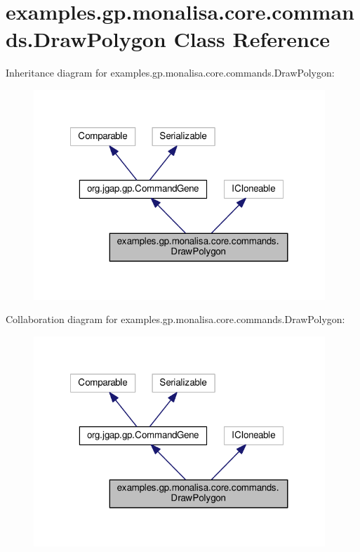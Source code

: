 \hypertarget{classexamples_1_1gp_1_1monalisa_1_1core_1_1commands_1_1_draw_polygon}{\section{examples.\-gp.\-monalisa.\-core.\-commands.\-Draw\-Polygon Class Reference}
\label{classexamples_1_1gp_1_1monalisa_1_1core_1_1commands_1_1_draw_polygon}
}


Inheritance diagram for examples.\-gp.\-monalisa.\-core.\-commands.\-Draw\-Polygon\-:
\nopagebreak
\begin{figure}[H]
\begin{center}
\leavevmode
\includegraphics[width=311pt]{classexamples_1_1gp_1_1monalisa_1_1core_1_1commands_1_1_draw_polygon__inherit__graph}
\end{center}
\end{figure}


Collaboration diagram for examples.\-gp.\-monalisa.\-core.\-commands.\-Draw\-Polygon\-:
\nopagebreak
\begin{figure}[H]
\begin{center}
\leavevmode
\includegraphics[width=311pt]{classexamples_1_1gp_1_1monalisa_1_1core_1_1commands_1_1_draw_polygon__coll__graph}
\end{center}
\end{figure}
